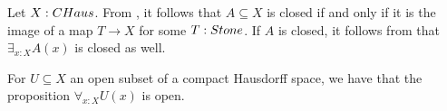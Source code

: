 \begin{remark}\label{InhabitedClosedSubSpaceClosedCHaus}
  Let $X:\Chaus$.
  From , it follows that $A\subseteq X$ is closed if and only if it is the image of a map 
  $T\to X$ for some $T:\Stone$. 
  If $A$ is closed, it follows from  that $\exists_{x:X} A(x)$ is closed as well. 
\end{remark}


\begin{corollary}\label{AllOpenSubspaceOpen}
  For $U\subseteq X$ an open subset of a compact Hausdorff space, we have that the proposition 
  $\forall_{x:X} U(x)$ is open. 
\end{corollary}

